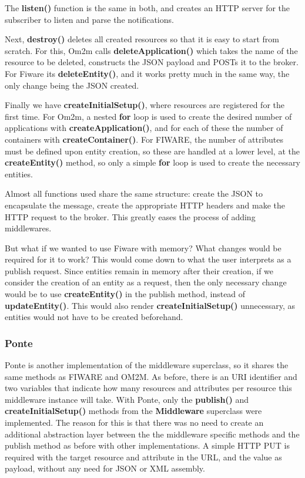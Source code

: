 \documentclass[conference]{IEEEtran}
\begin{document}
The \textbf{listen()} function is the same in both, and creates an HTTP server for the subscriber to listen and parse the notifications.

Next, \textbf{destroy()} deletes all created resources so that it is easy to start from scratch. For this, Om2m calls \textbf{deleteApplication()} which takes the name of the resource to be deleted, constructs the JSON payload and POSTs it to the broker. For Fiware its \textbf{deleteEntity()}, and it works pretty much in the same way, the only change being the JSON created.

Finally we have \textbf{createInitialSetup()}, where resources are registered for the first time. For Om2m, a nested \textbf{for} loop is used to create the desired number of applications with \textbf{createApplication()}, and for each of these the number of containers with \textbf{createContainer()}. For FIWARE, the number of attributes must be defined upon entity creation, so these are handled at a lower level, at the \textbf{createEntity()} method, so only a simple \textbf{for} loop is used to create the necessary entities.

Almost all functions used share the same structure: create the JSON to encapsulate the message, create the appropriate HTTP headers and make the HTTP request to the broker. This greatly eases the process of adding middlewares.

But what if we wanted to use Fiware with memory? What changes would be required for it to work? This would come down to what the user interprets as a publish request. Since entities remain in memory after their creation, if we consider the creation of an entity as a request, then the only necessary change would be to use \textbf{createEntity()} in the publish method, instead of \textbf{updateEntity()}. This would also render \textbf{createInitialSetup()} unnecessary, as entities would not have to be created beforehand. 

\subsubsection{Ponte}

Ponte is another implementation of the middleware superclass, so it shares the same methods as FIWARE and OM2M.
As before, there is an URI identifier and two variables that indicate how many resources and attributes per resource this middleware instance will take. With Ponte, only the \textbf{publish()} and \textbf{createInitialSetup()} methods from the \textbf{Middleware} superclass were implemented. The reason for this is that there was no need to create an additional abstraction layer between the the middleware specific methods and the publish method as before with other implementations. A simple HTTP PUT is required with the target resource and attribute in the URL, and the value as payload, without any need for JSON or XML assembly.
\end{document}
